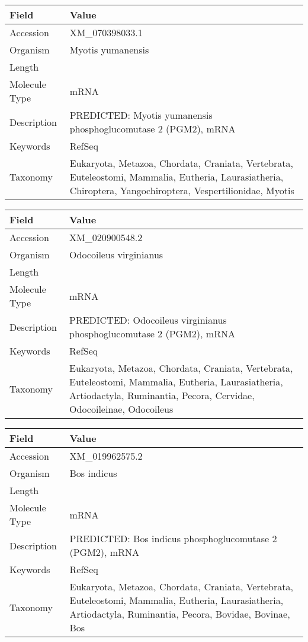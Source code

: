 \documentclass[10pt]{article}
\begin{document}
\vspace{1em}
{\footnotesize
\begin{longtable}{>{\raggedright\arraybackslash}p{4.5cm} >{\raggedright\arraybackslash}p{11.5cm}}
\textbf{Field} & \textbf{Value} \\
\hline
Accession & XM\_070398033.1 \\
Organism & Myotis yumanensis \\
Length & 1996 \\
Molecule Type & mRNA \\
Description & PREDICTED: Myotis yumanensis phosphoglucomutase 2 (PGM2), mRNA \\
Keywords & RefSeq \\
Taxonomy & Eukaryota, Metazoa, Chordata, Craniata, Vertebrata, Euteleostomi, Mammalia, Eutheria, Laurasiatheria, Chiroptera, Yangochiroptera, Vespertilionidae, Myotis \\
\end{longtable}
}

\vspace{1em}
{\footnotesize
\begin{longtable}{>{\raggedright\arraybackslash}p{4.5cm} >{\raggedright\arraybackslash}p{11.5cm}}
\textbf{Field} & \textbf{Value} \\
\hline
Accession & XM\_020900548.2 \\
Organism & Odocoileus virginianus \\
Length & 4172 \\
Molecule Type & mRNA \\
Description & PREDICTED: Odocoileus virginianus phosphoglucomutase 2 (PGM2), mRNA \\
Keywords & RefSeq \\
Taxonomy & Eukaryota, Metazoa, Chordata, Craniata, Vertebrata, Euteleostomi, Mammalia, Eutheria, Laurasiatheria, Artiodactyla, Ruminantia, Pecora, Cervidae, Odocoileinae, Odocoileus \\
\end{longtable}
}

\vspace{1em}
{\footnotesize
\begin{longtable}{>{\raggedright\arraybackslash}p{4.5cm} >{\raggedright\arraybackslash}p{11.5cm}}
\textbf{Field} & \textbf{Value} \\
\hline
Accession & XM\_019962575.2 \\
Organism & Bos indicus \\
Length & 7359 \\
Molecule Type & mRNA \\
Description & PREDICTED: Bos indicus phosphoglucomutase 2 (PGM2), mRNA \\
Keywords & RefSeq \\
Taxonomy & Eukaryota, Metazoa, Chordata, Craniata, Vertebrata, Euteleostomi, Mammalia, Eutheria, Laurasiatheria, Artiodactyla, Ruminantia, Pecora, Bovidae, Bovinae, Bos \\
\end{longtable}
}
\end{document}
